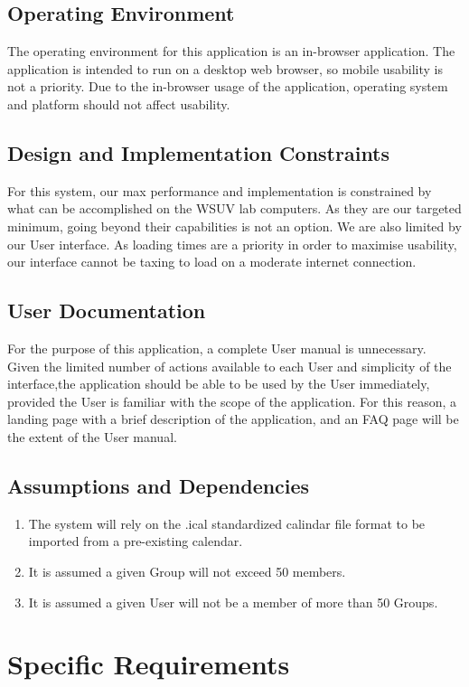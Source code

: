 \documentclass{scrreprt}
\begin{document}
\section{Operating Environment}
The operating environment for this application is an in-browser application. The
application is intended to run on a desktop web browser, so mobile usability is
not a priority. Due to the in-browser usage of the application, operating system
and platform should not affect usability.

\section{Design and Implementation Constraints}
For this system, our max performance and implementation is constrained by what
can be accomplished on the WSUV lab computers. As they are our targeted minimum,
going beyond their capabilities is not an option. We are also limited by our User
interface. As loading times are a priority in order to maximise usability, our
interface cannot be taxing to load on a moderate internet connection.

\section{User Documentation}
For the purpose of this application, a complete User manual is unnecessary.
Given the limited number of actions available to each User and simplicity of the
interface,the application should be able to be used by the User immediately,
provided the User is familiar with the scope of the application. For this
reason, a landing page with a brief description of the application, and an FAQ
page will be the extent of the User manual.

\section{Assumptions and Dependencies}
\begin{enumerate}
\item The system will rely on the .ical standardized calindar file format to
be imported from a pre-existing calendar.
\item It is assumed a given Group will not exceed 50 members.
\item It is assumed a given User will not be a member of more than 50 Groups.
\end{enumerate}


\chapter{Specific Requirements}
\end{document}
